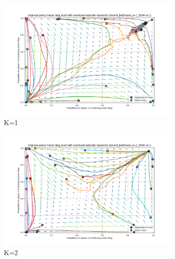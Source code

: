 \documentclass[12pt,a4paper, onecolumn]{exam}
\begin{document}
\begin{appendices}
    \begin{figure}[H]
        \centering
        \begin{subfigure}{0.44\textwidth}
            \centering
            \includegraphics[width=\linewidth]{plots/replicator_trajectoreis_Stag_Hunt_lenient_boltzmann_K=1_TEMP=0.1.png}
            \caption{K=1}
        \end{subfigure}
        \hfill
        \begin{subfigure}{0.44\textwidth}
            \centering
            \includegraphics[width=\linewidth]{plots/replicator_trajectoreis_Stag_Hunt_lenient_boltzmann_K=2_TEMP=0.1.png}
            \caption{K=2}
        \end{subfigure}
        \vspace{0.5cm}
        \begin{subfigure}{0.44\textwidth}
            \centering

\end{subfigure}
\end{figure}
\end{appendices}
\end{document}
